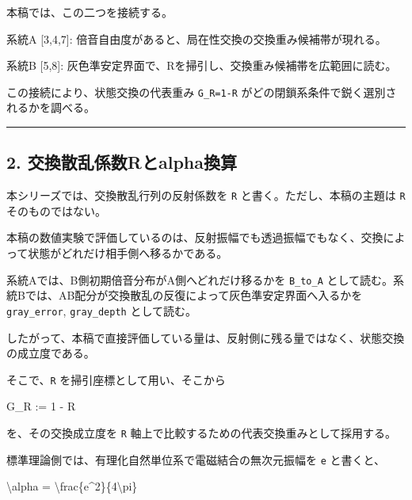 \documentclass[
]{article}
\newenvironment{Shaded}{}{}
\newcommand{\NormalTok}[1]{#1}
\begin{document}
本稿では、この二つを接続する。

\begin{Shaded}
\begin{Highlighting}[]
\NormalTok{系統A [3,4,7]:}
\NormalTok{  倍音自由度があると、局在性交換の交換重み候補帯が現れる。}

\NormalTok{系統B [5,8]:}
\NormalTok{  灰色準安定界面で、Rを掃引し、交換重み候補帯を広範囲に読む。}
\end{Highlighting}
\end{Shaded}

この接続により、状態交換の代表重み \texttt{G\_R=1-R}
がどの閉鎖系条件で鋭く選別されるかを調べる。

\begin{center}\rule{0.5\linewidth}{0.5pt}\end{center}

\subsection{2.
交換散乱係数Rとalpha換算}\label{ux4ea4ux63dbux6563ux4e71ux4fc2ux6570rux3068alphaux63dbux7b97}

本シリーズでは、交換散乱行列の反射係数を \texttt{R}
と書く。ただし、本稿の主題は \texttt{R} そのものではない。

本稿の数値実験で評価しているのは、反射振幅でも透過振幅でもなく、交換によって状態がどれだけ相手側へ移るかである。

系統Aでは、B側初期倍音分布がA側へどれだけ移るかを \texttt{B\_to\_A}
として読む。系統Bでは、AB配分が交換散乱の反復によって灰色準安定界面へ入るかを
\texttt{gray\_error}, \texttt{gray\_depth} として読む。

したがって、本稿で直接評価している量は、反射側に残る量ではなく、状態交換の成立度である。

そこで、\texttt{R} を掃引座標として用い、そこから

\begin{Shaded}
\begin{Highlighting}[]
\NormalTok{G\_R := 1 {-} R}
\end{Highlighting}
\end{Shaded}

を、その交換成立度を \texttt{R}
軸上で比較するための代表交換重みとして採用する。

標準理論側では、有理化自然単位系で電磁結合の無次元振幅を \texttt{e}
と書くと、

\begin{Shaded}
\begin{Highlighting}[]
\NormalTok{\textbackslash{}alpha = \textbackslash{}frac\{e\^{}2\}\{4\textbackslash{}pi\}}
\end{Highlighting}
\end{Shaded}
\end{document}

